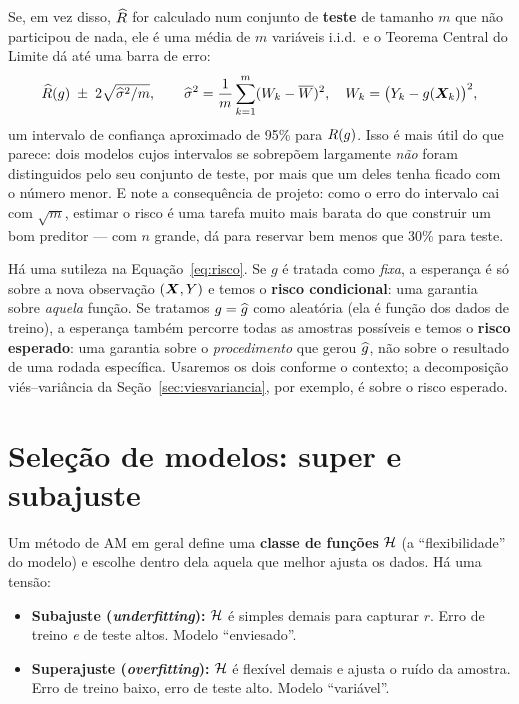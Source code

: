 \documentclass[11pt,a4paper]{article}
\begin{document}
Se, em vez disso, $\widehat{R}$ for calculado num conjunto de \textbf{teste} de tamanho
$m$ que não participou de nada, ele é uma média de $m$ variáveis i.i.d.\ e o Teorema
Central do Limite dá até uma barra de erro:
\begin{equation}\label{eq:ic}
  \widehat{R}(g) \;\pm\; 2\sqrt{\widehat\sigma^2/m},
  \qquad
  \widehat\sigma^2=\frac1m\sum_{k=1}^m (W_k-\overline W)^2,
  \quad W_k=\big(Y_k-g(\bm{X}_k)\big)^2,
\end{equation}
um intervalo de confiança aproximado de 95\% para $R(g)$. Isso é mais útil do
que parece: dois modelos cujos intervalos se sobrepõem largamente \emph{não} foram
distinguidos pelo seu conjunto de teste, por mais que um deles tenha ficado com o
número menor. E note a consequência de projeto: como o erro do intervalo cai com
$\sqrt m$, estimar o risco é uma tarefa muito mais barata do que construir um bom
preditor --- com $n$ grande, dá para reservar bem menos que 30\% para teste.

\begin{observacao}
Há uma sutileza na Equação~\eqref{eq:risco}. Se $g$ é tratada como \emph{fixa}, a
esperança é só sobre a nova observação $(\bm{X},Y)$ e temos o \textbf{risco condicional}:
uma garantia sobre \emph{aquela} função. Se tratamos $g=\widehat{g}$ como aleatória (ela é
função dos dados de treino), a esperança também percorre todas as amostras
possíveis e temos o \textbf{risco esperado}: uma garantia sobre o \emph{procedimento}
que gerou $\widehat{g}$, não sobre o resultado de uma rodada específica. Usaremos os dois
conforme o contexto; a decomposição viés--variância da
Seção~\ref{sec:viesvariancia}, por exemplo, é sobre o risco esperado.
\end{observacao}

\section{Seleção de modelos: super e subajuste}
Um método de AM em geral define uma \textbf{classe de funções} $\mathcal{H}$ (a
``flexibilidade'' do modelo) e escolhe dentro dela aquela que melhor ajusta os
dados. Há uma tensão:
\begin{itemize}[leftmargin=1.4cm]
  \item \textbf{Subajuste (\emph{underfitting}):} $\mathcal{H}$ é simples demais para
        capturar $r$. Erro de treino \emph{e} de teste altos. Modelo
        ``enviesado''.
  \item \textbf{Superajuste (\emph{overfitting}):} $\mathcal{H}$ é flexível demais e
        ajusta o ruído da amostra. Erro de treino baixo, erro de teste alto.
        Modelo ``variável''.
\end{itemize}
\end{document}
